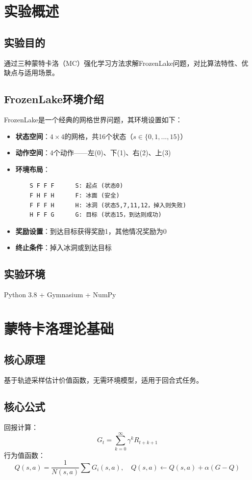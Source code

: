 \documentclass[11pt,a4paper]{article}
\begin{document}
\section{实验概述}
\subsection{实验目的}
通过三种蒙特卡洛（MC）强化学习方法求解FrozenLake问题，对比算法特性、优缺点与适用场景。

\subsection{FrozenLake环境介绍}
FrozenLake是一个经典的网格世界问题，其环境设置如下：

\begin{itemize}
    \item \textbf{状态空间}：$4 \times 4$的网格，共16个状态（$s \in \{0,1,...,15\}$）
    \item \textbf{动作空间}：4个动作——左(0)、下(1)、右(2)、上(3)
    \item \textbf{环境布局}：
    \begin{verbatim}
    S F F F      S: 起点 (状态0)
    F H F H      F: 冰面 (安全)
    F F F H      H: 冰洞 (状态5,7,11,12，掉入则失败)
    H F F G      G: 目标 (状态15，到达则成功)
    \end{verbatim}
    \item \textbf{奖励设置}：到达目标获得奖励1，其他情况奖励为0
    \item \textbf{终止条件}：掉入冰洞或到达目标
\end{itemize}
\subsection{实验环境}
Python 3.8 + Gymnasium + NumPy

\section{蒙特卡洛理论基础}
\subsection{核心原理}
基于轨迹采样估计价值函数，无需环境模型，适用于回合式任务。
\subsection{核心公式}
回报计算：
\[ G_t = \sum_{k=0}^{\infty} \gamma^k R_{t+k+1} \]
行为值函数：
\[ Q(s,a) = \frac{1}{N(s,a)} \sum G_i(s,a),\quad Q(s,a) \leftarrow Q(s,a) + \alpha (G-Q) \]
\end{document}
